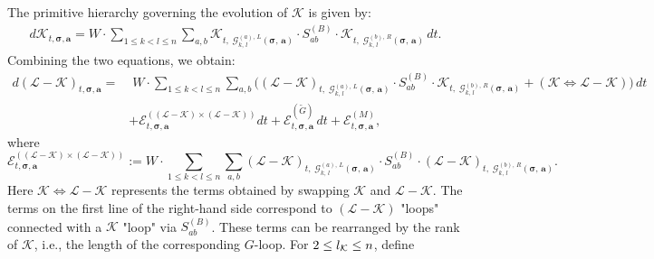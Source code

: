 \documentclass[10pt,reqno]{article}
\theoremstyle{plain} %
\theoremstyle{remark}
\numberwithin{equation}{section}
\begin{document}
The primitive hierarchy governing the evolution of \(\mathcal{K}\) is given by:
\begin{align}
    d\mathcal{K}_{t, \boldsymbol{\sigma}, \textbf{a}} = 
    W\cdot\sum_{1 \leq k < l \leq n} \sum_{a, b}\mathcal{K}_{t,\;  \mathcal{G}^{(a), \,L}_{k, \,l}\left(\boldsymbol{\sigma},\, \textbf{a}\right)} \cdot S^{(B)}_{ab} \cdot \mathcal{K}_{t,\;  \mathcal{G}^{(b), \,R}_{k, \,l}\left(\boldsymbol{\sigma},\, \textbf{a}\right)} \, dt.
\end{align}
Combining the two equations, we obtain:
\begin{align}\label{eq_L-K-1}
    d(\mathcal{L} - \mathcal{K})_{t, \boldsymbol{\sigma}, \textbf{a}} 
    = &\; 
   W\cdot \sum_{1 \leq k < l \leq n} \sum_{a, b} 
   \Big( 
   (\mathcal{L} - \mathcal{K})_{t,\;  \mathcal{G}^{(a), \,L}_{k, \,l}\left(\boldsymbol{\sigma},\, \textbf{a}\right)} 
   \cdot S^{(B)}_{ab}
   \cdot 
   \mathcal{K}_{t,\;  \mathcal{G}^{(b), \,R}_{k, \,l}\left(\boldsymbol{\sigma},\, \textbf{a}\right)} 
     +  
     \left(\mathcal{K} \iff \mathcal{L-K} \right)
   \Big) \, dt \nonumber \\ 
    & + \mathcal{E}^{((\mathcal{L} - \mathcal{K}) \times (\mathcal{L} - \mathcal{K}))}_{t, \boldsymbol{\sigma}, \textbf{a}}dt 
    + \mathcal{E}^{(\widetilde{G})}_{t, \boldsymbol{\sigma}, \textbf{a}}\,dt+ \mathcal{E}^{(M)}_{t, \boldsymbol{\sigma}, \textbf{a}} 
    , 
\end{align}
where
\begin{equation}\label{def_ELKLK}
    \mathcal{E}^{((\mathcal{L} - \mathcal{K}) \times (\mathcal{L} - \mathcal{K}))}_{t, \boldsymbol{\sigma}, \textbf{a}} :=
    W\cdot\sum_{1 \leq k < l \leq n} \sum_{a, b} (\mathcal{L} - \mathcal{K})_{t,\;  \mathcal{G}^{(a), \,L}_{k, \,l}\left(\boldsymbol{\sigma},\, \textbf{a}\right)} \cdot  S^{(B)}_{ab} \cdot (\mathcal{L} - \mathcal{K})_{t,\;  \mathcal{G}^{(b), \,R}_{k, \,l}\left(\boldsymbol{\sigma},\, \textbf{a}\right)}  .
\end{equation}
Here \( \mathcal{K} \iff \mathcal{L-K} \) represents the terms obtained by swapping \(\mathcal{K}\) and \(\mathcal{L-K}\). The terms on the first line of the right-hand side correspond to \((\mathcal{L} - \mathcal{K})\) "loops" connected with a \(\mathcal{K}\) "loop" via \(S^{(B)}_{ab}\). These terms can be rearranged by the rank of $\mathcal{K}$, i.e., the length of the corresponding $G$-loop. For \(2\le l_{\cal K}\le n\), define
\end{document}
